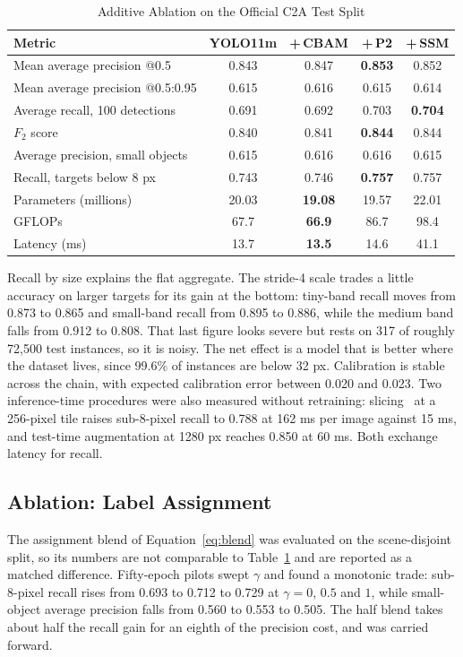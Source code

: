 \documentclass[conference,a4paper]{IEEEtran}
\begin{document}
\begin{table}[t]
\caption{Additive Ablation on the Official C2A Test Split}
\label{tab:abl}
\begin{center}
\footnotesize
\setlength{\tabcolsep}{2.2pt}
\begin{tabular}{|l|c|c|c|c|}
\hline
\textbf{Metric} & \textbf{YOLO11m} & \textbf{+\,CBAM} & \textbf{+\,P2} & \textbf{+\,SSM} \\
\hline
\hline
Mean average precision @0.5 & 0.843 & 0.847 & \textbf{0.853} & 0.852 \\
\hline
Mean average precision @0.5:0.95 & 0.615 & 0.616 & 0.615 & 0.614 \\
\hline
Average recall, 100 detections & 0.691 & 0.692 & 0.703 & \textbf{0.704} \\
\hline
$F_2$ score & 0.840 & 0.841 & \textbf{0.844} & 0.844 \\
\hline
\hline
Average precision, small objects & 0.615 & 0.616 & 0.616 & 0.615 \\
\hline
Recall, targets below 8 px & 0.743 & 0.746 & \textbf{0.757} & 0.757 \\
\hline
\hline
Parameters (millions) & 20.03 & \textbf{19.08} & 19.57 & 22.01 \\
\hline
GFLOPs & 67.7 & \textbf{66.9} & 86.7 & 98.4 \\
\hline
Latency (ms) & 13.7 & \textbf{13.5} & 14.6 & 41.1 \\
\hline
\end{tabular}
\end{center}
\end{table}

Recall by size explains the flat aggregate. The stride-4 scale trades a little
accuracy on larger targets for its gain at the bottom: tiny-band recall moves
from 0.873 to 0.865 and small-band recall from 0.895 to 0.886, while the medium
band falls from 0.912 to 0.808. That last figure looks severe but rests on 317
of roughly 72{,}500 test instances, so it is noisy. The net effect is a model
that is better where the dataset lives, since 99.6\% of instances are below
32 px. Calibration is stable across the chain, with expected calibration error
between 0.020 and 0.023. Two inference-time procedures were also measured
without retraining: slicing~\cite{akyon2022sahi} at a 256-pixel tile raises
sub-8-pixel recall to 0.788 at 162 ms per image against 15 ms, and test-time
augmentation at 1280 px reaches 0.850 at 60 ms. Both exchange latency for recall.

\subsection{Ablation: Label Assignment}
The assignment blend of Equation~\eqref{eq:blend} was evaluated on the
scene-disjoint split, so its numbers are not comparable to Table~\ref{tab:abl}
and are reported as a matched difference. Fifty-epoch pilots swept $\gamma$ and
found a monotonic trade: sub-8-pixel recall rises from 0.693 to 0.712 to 0.729
at $\gamma = 0$, $0.5$ and $1$, while small-object average precision falls from
0.560 to 0.553 to 0.505. The half blend takes about half the recall gain for an
eighth of the precision cost, and was carried forward.
\end{document}
